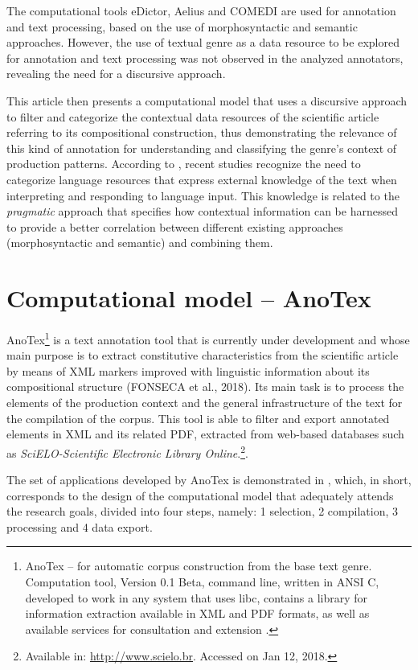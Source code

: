 \documentclass[english]{textolivre}
\begin{document}
The computational tools eDictor, Aelius and COMEDI are used for annotation and text processing, based on the use of morphosyntactic and semantic approaches. However, the use of textual genre as a data resource to be explored for annotation and text processing was not observed in the analyzed annotators, revealing the need for a discursive approach.

This article then presents a computational model that uses a discursive approach to filter and categorize the contextual data resources of the scientific article referring to its compositional construction, thus demonstrating the relevance of this kind of annotation for understanding and classifying the genre’s context of production patterns. According to \textcite{cambria_jumping_2014}, recent studies recognize the need to categorize language resources that express external knowledge of the text when interpreting and responding to language input. This knowledge is related to the \textit{pragmatic} approach that specifies how contextual information can be harnessed to provide a better correlation between different existing approaches (morphosyntactic and semantic) and combining them.

\section{Computational model – AnoTex}\label{sec-secoes}
AnoTex\footnote{AnoTex – for automatic corpus construction from the base text genre. Computation tool, Version 0.1 Beta, command line, written in ANSI C, developed to work in any system that uses libc, contains a library for information extraction available in XML and PDF formats, as well as available services for consultation and extension \cite{fonseca_2018}.} is a text annotation tool that is currently under development and whose main purpose is to extract constitutive characteristics from the scientific article by means of XML markers improved with linguistic information about its compositional structure (FONSECA et al., 2018). Its main task is to process the elements of the production context and the general infrastructure of the text for the compilation of the corpus. This tool is able to filter and export annotated elements in XML and its related PDF, extracted from web-based databases such as \textit{SciELO-Scientific Electronic Library Online}.\footnote{Available in: \url{http://www.scielo.br}. Accessed on Jan 12, 2018.}.

The set of applications developed by AnoTex is demonstrated in , which, in short, corresponds to the design of the computational model that adequately attends the research goals, divided into four steps, namely: 1 selection, 2 compilation, 3 processing and 4 data export.
\end{document}
